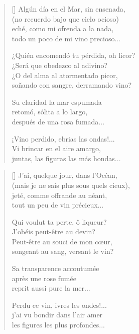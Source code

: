 



\settowidth{\versewidth}{¿Quién encomendó tu pérdida, oh licor?}

\bigskip

\begin{verse}[\versewidth]
  Algún día en el Mar, sin ensenada, \\
  (no recuerdo bajo que cielo ocioso) \\
  eché, como mi ofrenda a la nada, \\
  todo un poco de mi vino precioso...

  ¿Quién encomendó tu pérdida, oh licor? \\
  ¿Será que obedezco al adivino? \\
  ¿O del alma al atormentado picor, \\
  soñando con sangre, derramando vino?

  Su claridad la mar espumada \\
  retomó, sólita a lo largo, \\
  después de una rosa fumada...

  ¡Vino perdido, ebrias las ondas!... \\
  Vi brincar en el aire amargo, \\
  juntas, las figuras las más hondas...
\end{verse}

\newpage



\settowidth{\versewidth}{(Mais je ne sais plus sous quels cieux),}

\bigskip

{\itshape
\begin{verse}[\versewidth]
  J'ai, quelque jour, dans l'Océan, \\
  (mais je ne sais plus sous quels cieux), \\
  jeté, comme offrande au néant, \\
  tout un peu de vin précieux...

  Qui voulut ta perte, ô liqueur? \\
  J'obéis peut-être au devin? \\
  Peut-être au souci de mon cœur, \\
  songeant au sang, versant le vin?

  Sa transparence accoutumée \\
  après une rose fumée \\
  reprit aussi pure la mer...

  Perdu ce vin, ivres les ondes!... \\
  j'ai vu bondir dans l'air amer \\
  les figures les plus profondes...
\end{verse}
}
